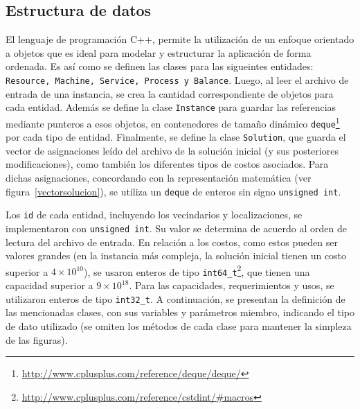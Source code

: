 \documentclass[../informe2.tex]{subfiles}
\begin{document}
\subsection{Estructura de datos}
El lenguaje de programación C++, permite la utilización de un enfoque orientado a objetos que es ideal para modelar y estructurar la aplicación de forma ordenada. Es así como se definen las clases para las sigueintes entidades: \texttt{Resource, Machine, Service, Process y Balance}. Luego, al leer el archivo de entrada de una instancia, se crea la cantidad correspondiente de objetos para cada entidad. Además se define la clase \texttt{Instance} para guardar las referencias mediante punteros a esos objetos, en contenedores de tamaño dinámico \texttt{deque}\footnote{\url{http://www.cplusplus.com/reference/deque/deque/}} por cada tipo de entidad. Finalmente, se define la clase \texttt{Solution}, que guarda el vector de asignaciones leído del archivo de la solución inicial (y sus posteriores modificaciones), como también los diferentes tipos de costos asociados. Para dichas asignaciones, concordando con la representación matemática (ver figura~\ref{vectorsolucion}), se utiliza un \texttt{deque} de enteros sin signo \texttt{unsigned int}. \par
\noindent Los \texttt{id} de cada entidad, incluyendo los vecindarios y localizaciones, se implementaron con \texttt{unsigned int}. Su valor se determina de acuerdo al orden de lectura del archivo de entrada. En relación a los costos, como estos pueden ser valores grandes (en la instancia más compleja, la solución inicial tienen un costo superior a $4\times10^{10}$), se usaron enteros de tipo \texttt{int64\_t}\footnote{\url{http://www.cplusplus.com/reference/cstdint/\#macros}}, que tienen una capacidad superior a $9\times10^{18}$. Para las capacidades, requerimientos y usos, se utilizaron enteros de tipo \texttt{int32\_t}. A continuación, se presentan la definición de las mencionadas clases, con sus variables y parámetros miembro, indicando el tipo de dato utilizado (se omiten los métodos de cada clase para mantener la simpleza de las figuras).

\vspace{1cm}
\end{document}
